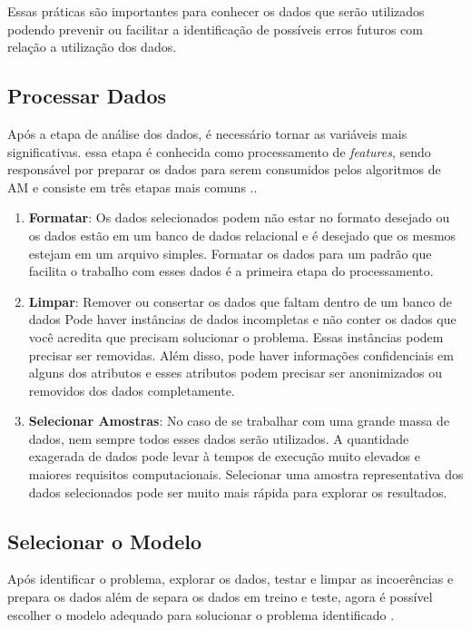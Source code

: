 Essas práticas são importantes para conhecer os dados que serão utilizados podendo prevenir ou facilitar a identificação de possíveis erros futuros com relação a utilização dos dados.

\subsection{Processar Dados}

Após a etapa de análise dos dados, é necessário tornar as variáveis mais significativas. essa etapa é conhecida como processamento de \textit{features}, sendo responsável por preparar os dados para serem consumidos pelos algoritmos de AM e consiste em três etapas mais comuns \cite{prepareDataML}..

\begin{enumerate}
    \item \textbf{Formatar}: Os dados selecionados podem não estar no formato desejado ou os dados estão em um banco de dados relacional e é desejado que os mesmos estejam em um arquivo simples. Formatar os dados para um padrão que facilita o trabalho com esses dados é a primeira etapa do processamento.
    \item \textbf{Limpar}: Remover ou consertar os dados que faltam dentro de um banco de dados  Pode haver instâncias de dados incompletas e não conter os dados que você acredita que precisam solucionar o problema. Essas instâncias podem precisar ser removidas. Além disso, pode haver informações confidenciais em alguns dos atributos e esses atributos podem precisar ser anonimizados ou removidos dos dados completamente.
    \item \textbf{Selecionar Amostras}: No caso de se trabalhar com uma grande massa de dados, nem sempre todos esses dados serão utilizados. A quantidade exagerada de dados pode levar à tempos de execução muito elevados e maiores requisitos computacionais. Selecionar uma amostra representativa dos dados selecionados pode ser muito mais rápida para explorar os resultados.
\end{enumerate}

\subsection{Selecionar o Modelo}
Após identificar o problema, explorar os dados, testar e limpar as incoerências e prepara os dados além de separa os dados em treino e teste, agora é possível escolher o modelo adequado para solucionar o problema identificado \cite{geron2017hands}.

